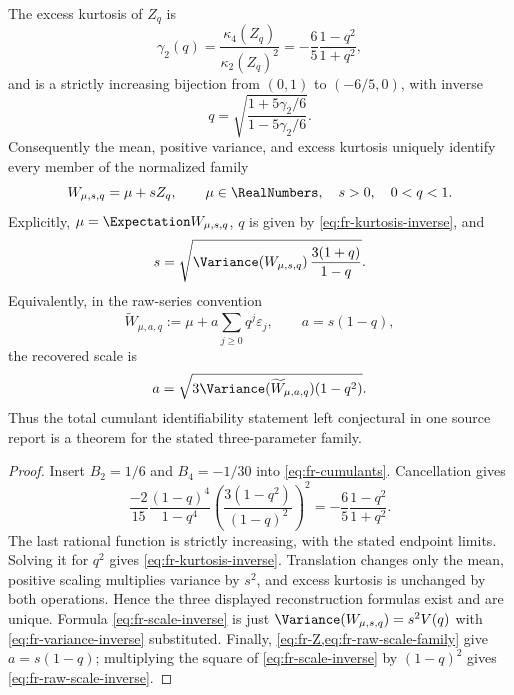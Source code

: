 \begin{theorem}
\label{thm:fr-total-identifiability}
The excess kurtosis of \(Z_q\) is
\begin{equation}
 \gamma_2(q)=\frac{\kappa_4(Z_q)}{\kappa_2(Z_q)^2}
 =-\frac65\frac{1-q^2}{1+q^2},
 \label{eq:fr-kurtosis}
\end{equation}
and is a strictly increasing bijection from \((0,1)\) to \((-6/5,0)\), with
inverse
\begin{equation}
 q=\sqrt{\frac{1+5\gamma_2/6}{1-5\gamma_2/6}}.
 \label{eq:fr-kurtosis-inverse}
\end{equation}
Consequently the mean, positive variance, and excess kurtosis uniquely
identify every member of the normalized family
\[
 W_{\mu,s,q}=\mu+sZ_q,
 \qquad \mu\in\RealNumbers,\quad s>0,\quad0<q<1.
\]
Explicitly, \(\mu=\Expectation W_{\mu,s,q}\), \(q\) is given by
\cref{eq:fr-kurtosis-inverse}, and
\begin{equation}
 s=\sqrt{\Variance(W_{\mu,s,q})\,\frac{3(1+q)}{1-q}}.
 \label{eq:fr-scale-inverse}
\end{equation}
Equivalently, in the raw-series convention
\begin{equation}\label{eq:fr-raw-scale-family}
 \widetilde W_{\mu,a,q}
 :=\mu+a\sum_{j\ge0}q^j\varepsilon_j,
 \qquad a=s(1-q),
\end{equation}
the recovered scale is
\begin{equation}\label{eq:fr-raw-scale-inverse}
 a=\sqrt{3\Variance(\widetilde W_{\mu,a,q})(1-q^2)}.
\end{equation}
Thus the total cumulant identifiability statement left conjectural in one
source report is a theorem for the stated three-parameter family.
\end{theorem}

\begin{proof}
Insert \(B_2=1/6\) and \(B_4=-1/30\) into
\cref{eq:fr-cumulants}.  Cancellation gives
\[
 \frac{-2}{15}\frac{(1-q)^4}{1-q^4}
 \left(\frac{3(1-q^2)}{(1-q)^2}\right)^2
 =-\frac65\frac{1-q^2}{1+q^2}.
\]
The last rational function is strictly increasing, with the stated endpoint
limits.  Solving it for \(q^2\) gives
\cref{eq:fr-kurtosis-inverse}.  Translation changes only the mean, positive
scaling multiplies variance by \(s^2\), and excess kurtosis is unchanged by
both operations.  Hence the three displayed reconstruction formulas exist
and are unique.  Formula \cref{eq:fr-scale-inverse} is just
\(\Variance(W_{\mu,s,q})=s^2V(q)\) with
\cref{eq:fr-variance-inverse} substituted.  Finally,
\cref{eq:fr-Z,eq:fr-raw-scale-family} give \(a=s(1-q)\); multiplying the
square of \cref{eq:fr-scale-inverse} by \((1-q)^2\) gives
\cref{eq:fr-raw-scale-inverse}.
\end{proof}


